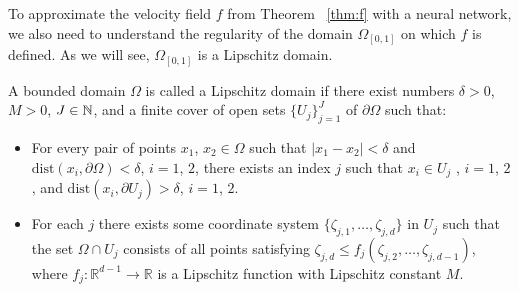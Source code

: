 To approximate the velocity field $f$ from Theorem ~\ref{thm:f} with a
  neural network, we also need to understand the regularity of the
domain $\Omega_{[0,1]}$
on which $f$ is defined. %
As we will see, $\Omega_{[0,1]}$ is a Lipschitz domain.

\begin{definition}
  A bounded domain
  $\Omega$ is called a Lipschitz domain if there exist numbers $\delta
  > 0$, $M > 0$,
  $J\in\mathbb{N}$, and a finite cover of open sets
  $\{U_j\}_{j=1}^J$ of $\partial\Omega$ such that:
  \begin{itemize}
  \item For every pair of points $x_1$, $x_2
    \in\Omega$ such that $|x_1 - x_2| < \delta$ and $\text{dist}(x_i,
    \partial\Omega) < \delta$, $i = 1$, $2$, there exists an index
    $j$ such that $x_i \in U_j$ , $i = 1$, $2$, and $\text{dist}(x_i,
    \partial U_j) > \delta$, $i = 1$, $2$.
  \item For each
    $j$ there exists some coordinate system
    $\{\zeta_{j,1},\dots ,\zeta_{j,d}\}$ in
    $U_j$ such that the set $\Omega \cap
    U_j$ consists of all points satisfying $\zeta_{j,d} \leq
    f_j(\zeta_{j,2},\dots ,\zeta_{j,d-1})$, where
    $f_j:\mathbb{R}^{d-1}\rightarrow\mathbb{R}$ is a Lipschitz
    function with Lipschitz constant $M$.
  \end{itemize}
\end{definition}





